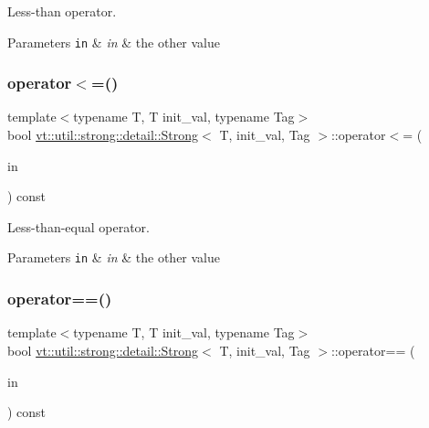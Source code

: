 Less-\/than operator. 


\begin{DoxyParams}[1]{Parameters}
\mbox{\tt in}  & {\em in} & the other value \\
\hline
\end{DoxyParams}
\mbox{\label{structvt_1_1util_1_1strong_1_1detail_1_1_strong_a5f36a542fc6a5716037c606ea090d635}} 
\subsubsection{\texorpdfstring{operator$<$=()}{operator<=()}}
{\footnotesize\ttfamily template$<$typename T, T init\+\_\+val, typename Tag$>$ \\
bool \hyperlink{structvt_1_1util_1_1strong_1_1detail_1_1_strong}{vt\+::util\+::strong\+::detail\+::\+Strong}$<$ T, init\+\_\+val, Tag $>$\+::operator$<$= (\begin{DoxyParamCaption}\item[{\hyperlink{structvt_1_1util_1_1strong_1_1detail_1_1_strong_a510d40741bda362d97a4753919a577dd}{This\+Type} const \&}]{in }\end{DoxyParamCaption}) const\hspace{0.3cm}{\ttfamily [inline]}}



Less-\/than-\/equal operator. 


\begin{DoxyParams}[1]{Parameters}
\mbox{\tt in}  & {\em in} & the other value \\
\hline
\end{DoxyParams}
\mbox{\label{structvt_1_1util_1_1strong_1_1detail_1_1_strong_ac32855789c8e77843e7b6a5b63698f67}} 
\subsubsection{\texorpdfstring{operator==()}{operator==()}}
{\footnotesize\ttfamily template$<$typename T, T init\+\_\+val, typename Tag$>$ \\
bool \hyperlink{structvt_1_1util_1_1strong_1_1detail_1_1_strong}{vt\+::util\+::strong\+::detail\+::\+Strong}$<$ T, init\+\_\+val, Tag $>$\+::operator== (\begin{DoxyParamCaption}\item[{\hyperlink{structvt_1_1util_1_1strong_1_1detail_1_1_strong_a510d40741bda362d97a4753919a577dd}{This\+Type} const \&}]{in }\end{DoxyParamCaption}) const\hspace{0.3cm}{\ttfamily [inline]}}



